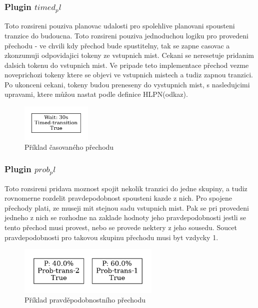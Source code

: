 \subsubsection{Plugin $timed_pl$}
\label{subsec:timed_pl}
Toto rozsireni pouziva planovac udalosti pro spolehlive planovani spousteni tranzice do budoucna. Toto rozsireni pouziva jednoduchou logiku pro provedeni přechodu - ve chvili kdy přechod bude spustitelny, tak se zapne casovac a zkonzumuji odpovidajici tokeny ze vstupnich mist. Cekani se neresetuje pridanim dalsich tokenu do vstupnich mist. Ve pripade teto implementace přechod vezme noveprichozi tokeny ktere se objevi ve vstupnich mistech a tudiz zapnou tranzici. Po ukonceni cekani, tokeny budou preneseny do vystupnich mist, s nasledujcimi upravami, ktere můžou nastat podle definice HLPN(odkaz).
\begin{figure}[hbt]
  \centering
  \includegraphics[width=0.3\textwidth]{obrazky-figures/timed-transition.png}
  \caption{Příklad časovaného přechodu}
  \label{timed-transition}
\end{figure}

\subsubsection{Plugin $prob_pl$}
\label{subsec:prob_pl}
Toto rozsireni pridava moznost spojit nekolik tranzici do jedne skupiny, a tudiz rovnomerne rozdelit pravdepodobnost spousteni kazde z nich. Pro spojene přechody plati, ze museji mit stejnou sadu vstupnich mist. Pak se pri provedeni jedneho z nich se rozhodne na zaklade hodnoty jeho pravdepodobnosti jestli se tento přechod musi provest, nebo se provede nektery z jeho sousedu. Soucet pravdepodobnosti pro takovou skupinu přechodu musi byt vzdycky 1.
\begin{figure}[hbt]
  \centering
  \includegraphics[width=0.6\textwidth]{obrazky-figures/prob-transition.png}
  \caption{Příklad pravděpodobnostního přechodu}
  \label{timed-transition}
\end{figure}

